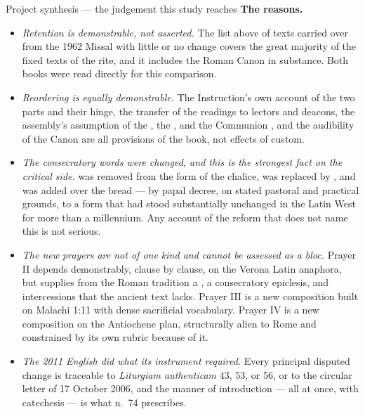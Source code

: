 \begin{studybox}{Project synthesis --- the judgement this study reaches}
\smallskip
\textbf{The reasons.}
\begin{itemize}[itemsep=0.15em]
\item \emph{Retention is demonstrable, not asserted.} The list above of texts carried over from
the 1962 Missal with little or no change covers the great majority of the fixed texts of the
rite, and it includes the Roman Canon in substance. Both books were read directly for this
comparison.
\item \emph{Reordering is equally demonstrable.} The Instruction's own account of the two parts
and their hinge, the transfer of the readings to lectors and deacons, the assembly's assumption
of the , the , and the Communion , and the
audibility of the Canon are all provisions of the book, not effects of custom.
\item \emph{The consecratory words were changed, and this is the strongest fact on the critical
side.}  was removed from the form of the chalice,  was replaced by , and
 was added over the bread --- by papal decree, on stated pastoral
and practical grounds, to a form that had stood substantially unchanged in the Latin West for
more than a millennium. Any account of the reform that does not name this is not serious.
\item \emph{The new prayers are not of one kind and cannot be assessed as a bloc.} Prayer II
depends demonstrably, clause by clause, on the Verona Latin anaphora, but supplies from the
Roman tradition a , a consecratory epiclesis, and intercessions that the ancient
text lacks. Prayer III is a new composition built on Malachi 1:11 with dense sacrificial
vocabulary. Prayer IV is a new composition on the Antiochene plan, structurally alien to Rome
and constrained by its own rubric because of it.
\item \emph{The 2011 English did what its instrument required.} Every principal disputed change
is traceable to \emph{Liturgiam authenticam} 43, 53, or 56, or to the circular letter of 17
October 2006, and the manner of introduction --- all at once, with catechesis --- is what n.\ 74
prescribes.
\end{itemize}


\end{studybox}
